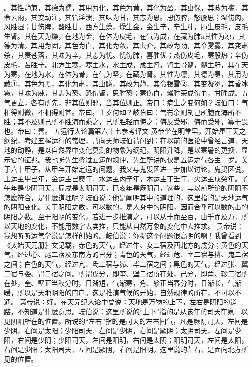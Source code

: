 \documentclass[a4paper,12pt,UTF8,twoside]{ctexbook}
\begin{document}
。其性静兼，其德为孺，其用为化，其色为黄，其化为盈，其虫保，其政为褴，其令云雨，其变动注，其管淫溃，其味为甘，其志为思。思伤脾，怒股思；湿伤肉，风胜湿；甘伤脾，酸胜甘。西方生燥，燥生金，金生辛，辛生肺，肺生皮毛，皮毛生肾。其在天为燥，在地为金，在体为皮毛，在气为成，在藏为肺n其性为凉，其德为清。其用为固，其色为白，其化为敛，其虫介，其政为劲，其令雾露，其变肃杀，其责苍落，其味为辛，其志为忧。忧伤肺，喜胜优；热伤皮毛，寒股热；辛伤皮毛，苦胜辛。北方生寒，寒生水，水生成，成生肾，肾生骨髓，髓生肝，其在天为寒，在地为水，在体为骨，在气为坚，在藏为肾。其性为凛，其德为寒，其用为藏①，其色为黑，其化为肃，其虫鳞，其政为静，其令银雪②，其变凝冽，其昏冰雹，其味为威，其志为恐。恐伤肾，思胜恐；寒伤血，燥胜荣成伤血，甘胜成。五气更立，各有所先，非其位则邪，当其位则正。帝曰：病生之变何如？岐伯曰：气相得则微，不相得则甚。帝曰。主岁何如？岐伯曰：气有余则制己所胞而海所不胜；其不及则己所不胜海而乘之，己所胜轻而悔之；侮反受邪，侮而受邪，寡于畏也。帝曰：善。
五运行大论篇第六十七参考译文
黄帝坐在明堂里，开始厘正天之纲纪，考建五握运行的常理，乃向天师岐伯请问到：在以前的医论中曾经言道，天地的动静，是以自然界中变化莫测的物象为纲纪，阴阳升降，是以寒暑的更换，显示它的征兆。我也听先生将过五运的规律，先生所讲的仅是五运之气各主一岁。关于六十甲子，从甲年开始定运的问题，我又与鬼叟区进一步加以讨论，鬼叟区说，土运主甲已年，金运主已庾年，水运主丙辛年，木运主丁壬年，火运主戊癸年。子午年是少阴司天，辰戌是太阴司天，巳亥年是厥阴司，这些，与以前所论的阴阳不怎麽符合，是什麽道理呢？岐伯说：他是阐明其中的道理的，这里指的是天地运气的阴阳变化。关于阴阳之数，可以数的，是人身中的阴阳，因而合乎可以数的出的阴阳之数。至于阳明的变化，若进一步推演之，可以从十而至百，由千而及万，所以天地的变化，不能用数字去类推，只能从自然万象的变化中去推求。
黄帝说：我想听听运气学说是怎样创始的。岐伯说：你提这个问题很高明的啊！我曾看到《太始天元册》文记载，赤色的天气，经过牛、女二宿及西北方的戊分；黄色的天气，经过心、尾二宿及东南方的已分；青色的天气，经过危、室二宿与柳、鬼二宿之间；白色的天气，经过亢、氐二宿与昴、毕二宿之间；黑色的天气，经过张、翼二宿与娄、胃二宿之间。所谓戊分，即奎、壁二宿所在处，己分，即角、轸二宿所在处，奎、壁正当秋分时，日渐短，气渐寒，角、轸正当春分时，日渐长，气渐暖，所以是天地阴阳的门户。这是推演气候的开始，自然规律的所在，不可以不通。
黄帝说：好。在天元纪大论中曾说：天地是万物的上下，左右是阴阳的道路，不知道是什麽意思。岐伯说：这里所说的“上下”指的是从该年的司天在泉，以见阴阳所在的位置。所说的“左右”指的是司天的左右间气，凡是厥阴司天，左间是少阴，右间是太阳；少阳司天，左间是少阴，右间是厥阴；太阴司天，左间是少阳，右间是少阴；少阳司天，左间是阳明，右间是太阴；阳明司天，左间是太阳，右间是少阳；太阳司天，左间是厥阴，右间是阳明。这里说的左右，是面向北方所见的位置。
\end{document}
